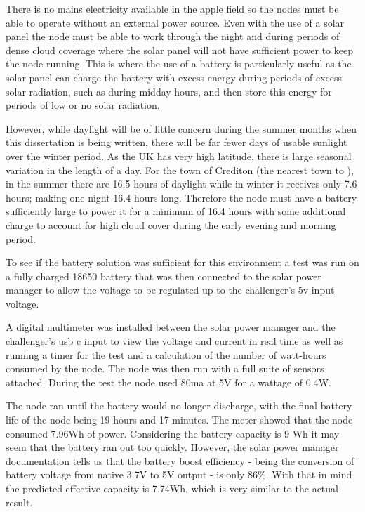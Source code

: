 There is no mains electricity available in the apple field so the nodes must be
able to operate without an external power source. Even with the use of a solar
panel the node must be able to work through the night and during periods of
dense cloud coverage where the solar panel will not have sufficient power to
keep the node running. This is where the use of a battery is particularly useful
as the solar panel can charge the battery with excess energy during periods of
excess solar radiation, such as during midday hours, and then store this energy
for periods of low or no solar radiation.

However, while daylight will be of little concern during the summer months when
this dissertation is being written, there will be far fewer days of usable
sunlight over the winter period. As the UK has very high latitude, there is
large seasonal variation in the length of a day. For the town of Crediton (the
nearest town to \farmName), in the summer there are 16.5 hours of daylight while
in winter it receives only 7.6 hours; making one night 16.4 hours long.
Therefore the node must have a battery sufficiently large to power it for a
minimum of 16.4 hours with some additional charge to account for high cloud
cover during the early evening and morning period.

To see if the battery solution was sufficient for this environment a test was
run on a fully charged 18650 battery that was then connected to the solar power
manager to allow the voltage to be regulated up to the challenger's 5v input
voltage.

A digital multimeter was installed between the solar power manager and the
challenger's usb c input to view the voltage and current in real time as well as
running a timer for the test and a calculation of the number of watt-hours
consumed by the node. The node was then run with a full suite of sensors
attached. During the test the node used 80ma at 5V for a wattage of 0.4W.

The node ran until the battery would no longer discharge, with the final battery
life of the node being 19 hours and 17 minutes. The meter showed that the node
consumed 7.96Wh of power. Considering the battery capacity is 9 Wh it may seem
that the battery ran out too quickly. However, the solar power manager
documentation tells us that the battery boost efficiency - being the conversion
of battery voltage from native 3.7V to 5V output - is only 86\%. With that in
mind the predicted effective capacity is 7.74Wh, which is very similar to the
actual result.

